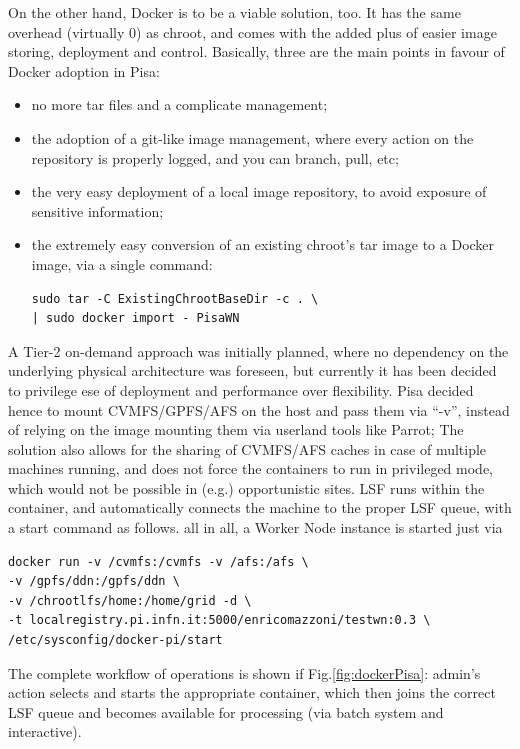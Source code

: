 \documentclass{PoS}
\begin{document}
On the other hand, Docker is to be a viable solution, too. It has the same overhead (virtually 0) as chroot, and comes with the added plus of easier image storing, deployment and control. Basically, three are the main points in favour of Docker adoption in Pisa: 
\begin{itemize}
\item no more tar files and a complicate management;
\item the adoption of a git-like image management, where every action on the repository is properly logged, and you can branch, pull, etc;
\item the very easy deployment of a local image repository, to avoid exposure of sensitive information;
\item the extremely easy conversion of an existing chroot's tar image to a Docker image, via a single command:
\begin{verbatim}
sudo tar -C ExistingChrootBaseDir -c . \
| sudo docker import - PisaWN
\end{verbatim}
\end{itemize}

A Tier-2 on-demand approach was initially planned, where no dependency on the underlying physical architecture was foreseen, but currently it has been decided to privilege ese of deployment and performance over flexibility. Pisa decided hence to mount CVMFS/GPFS/AFS on the host and pass them via ``-v'', instead of relying on the image mounting them via userland tools like Parrot;
The solution also allows for the sharing of CVMFS/AFS caches in case of multiple machines running, and does not force the containers to run in privileged mode, which would not be possible in (e.g.) opportunistic sites.
LSF  runs within the container, and automatically connects the machine to the proper LSF queue, with a start command as follows. all in all, a Worker Node instance is started just via
%
\begin{verbatim}
docker run -v /cvmfs:/cvmfs -v /afs:/afs \
-v /gpfs/ddn:/gpfs/ddn \
-v /chrootlfs/home:/home/grid -d \
-t localregistry.pi.infn.it:5000/enricomazzoni/testwn:0.3 \
/etc/sysconfig/docker-pi/start
\end{verbatim}

The complete workflow of operations is shown if Fig.\ref{fig:dockerPisa}: admin's action selects and starts the appropriate container, which then joins the correct LSF queue and becomes available for processing (via batch system and interactive).
\end{document}
